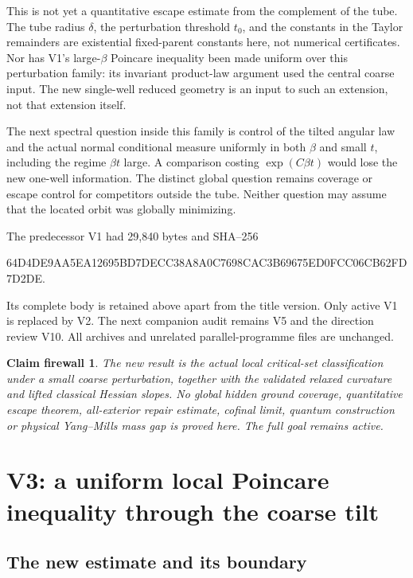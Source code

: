 \documentclass[11pt,oneside]{article}
\newtheorem{firewall}[theorem]{Claim firewall}
\begin{document}
This is not yet a quantitative
escape estimate from the
complement of the tube.
The tube radius \(\delta\),
the perturbation threshold
\(t_0\), and the constants
in the Taylor remainders
are existential fixed-parent
constants here, not numerical
certificates. Nor has V1's
large-\(\beta\) Poincare
inequality been made uniform
over this perturbation family:
its invariant product-law
argument used the central
coarse input. The new
single-well reduced geometry
is an input to such an
extension, not that extension
itself.

The next spectral question
inside this family is control
of the tilted angular law
and the actual normal
conditional measure uniformly
in both \(\beta\) and small
\(t\), including the regime
\(\beta t\) large. A
comparison costing
\(\exp(C\beta t)\) would
lose the new one-well
information. The distinct
global question remains
coverage or escape control
for competitors outside
the tube. Neither question
may assume that the located
orbit was globally minimizing.

The predecessor V1 had 29,840
bytes and SHA--256
\begin{center}\scriptsize\ttfamily
64D4DE9AA5EA12695BD7DECC38A8A0C7698CAC3B69675ED0FCC06CB62FD7D2DE.
\end{center}
Its complete body is retained
above apart from the title
version. Only active V1 is
replaced by V2. The next
companion audit remains V5
and the direction review V10.
All archives and unrelated
parallel-programme files
are unchanged.

\begin{firewall}
The new result is the actual
local critical-set classification
under a small coarse perturbation,
together with the validated
relaxed curvature and lifted
classical Hessian slopes.
No global hidden ground
coverage, quantitative
escape theorem, all-exterior
repair estimate, cofinal
limit, quantum construction
or physical Yang--Mills
mass gap is proved here.
The full goal remains active.
\end{firewall}
\section{V3: a uniform local Poincare inequality through the coarse tilt}
\label{sec:f13v3}

\subsection{The new estimate and its boundary}
\end{document}
